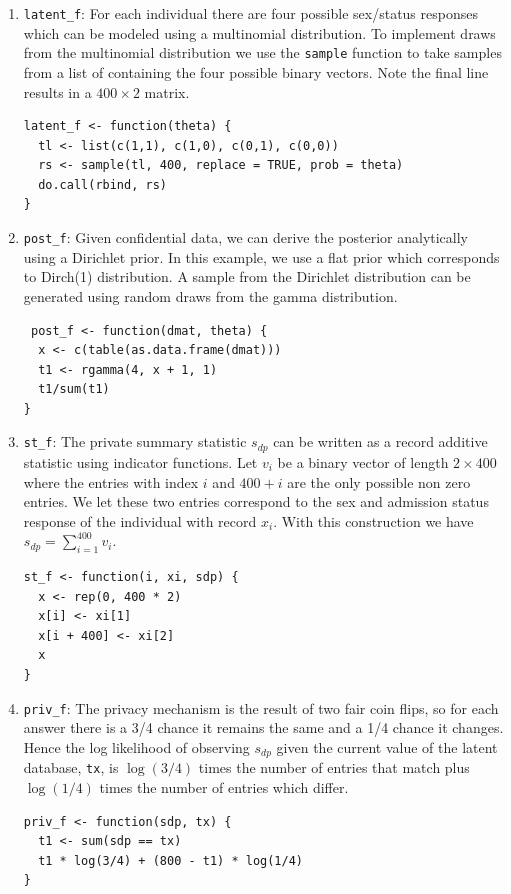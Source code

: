 \begin{enumerate}
\def\labelenumi{\arabic{enumi}.}
\item
  \texttt{latent\_f}: For each individual there are four possible
  sex/status responses which can be modeled using a multinomial distribution.
  To implement draws from the multinomial distribution we use the \texttt{sample} function
  to take samples from a list of containing the four possible binary vectors. Note
  the final line results in a \(400 \times 2\) matrix.

\begin{verbatim}
latent_f <- function(theta) {
  tl <- list(c(1,1), c(1,0), c(0,1), c(0,0))
  rs <- sample(tl, 400, replace = TRUE, prob = theta)
  do.call(rbind, rs)
}
\end{verbatim}
\item
  \texttt{post\_f}: Given confidential data, we can derive the posterior analytically
  using a Dirichlet prior. In this example, we use a flat prior which
  corresponds to Dirch(1) distribution. A sample from the Dirichlet distribution
  can be generated using random draws from the gamma distribution.

\begin{verbatim}
 post_f <- function(dmat, theta) {
  x <- c(table(as.data.frame(dmat)))
  t1 <- rgamma(4, x + 1, 1)
  t1/sum(t1)
}
\end{verbatim}
\item
  \texttt{st\_f}: The private summary statistic \(s_{dp}\) can be written as a record additive
  statistic using indicator functions. Let \(v_i\) be a binary vector of length \(2 \times 400\)
  where the entries with index \(i\) and \(400 + i\) are the only possible non zero entries.
  We let these two entries correspond to the sex and admission status response of
  the individual with record \(x_i\). With this construction we have \(s_{dp} = \sum_{i=1}^{400} v_i\).

\begin{verbatim}
st_f <- function(i, xi, sdp) {
  x <- rep(0, 400 * 2)
  x[i] <- xi[1]
  x[i + 400] <- xi[2]
  x
}
\end{verbatim}
\item
  \texttt{priv\_f}: The privacy mechanism is the result of two fair coin flips, so for
  each answer there is a 3/4 chance it remains the same and a 1/4 chance it changes.
  Hence the log likelihood of observing \(s_{dp}\) given the current value of the latent
  database, \texttt{tx}, is \(\log(3/4)\) times the number of entries that match plus \(\log(1/4)\) times
  the number of entries which differ.

\begin{verbatim}
priv_f <- function(sdp, tx) {
  t1 <- sum(sdp == tx)
  t1 * log(3/4) + (800 - t1) * log(1/4)
}
\end{verbatim}
\end{enumerate}


